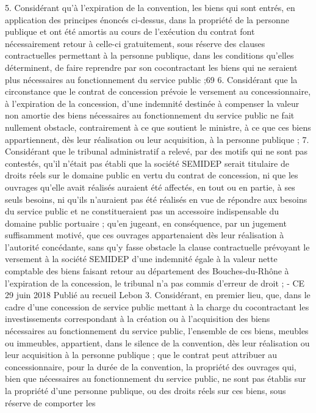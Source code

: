 \documentclass[11pt,a4paper]{report}
\begin{document}
5. Considérant qu'à l'expiration de la convention, les biens qui sont entrés, en application des principes
énoncés ci-dessus, dans la propriété de la personne publique et ont été amortis au cours de l'exécution
du contrat font nécessairement retour à celle-ci gratuitement, sous réserve des clauses contractuelles
permettant à la personne publique, dans les conditions qu'elles déterminent, de faire reprendre par son
cocontractant les biens qui ne seraient plus nécessaires au fonctionnement du service public ;69
6. Considérant que la circonstance que le contrat de concession prévoie le versement au
concessionnaire, à l'expiration de la concession, d'une indemnité destinée à compenser la valeur non
amortie des biens nécessaires au fonctionnement du service public ne fait nullement obstacle,
contrairement à ce que soutient le ministre, à ce que ces biens appartiennent, dès leur réalisation ou
leur acquisition, à la personne publique ;
7. Considérant que le tribunal administratif a relevé, par des motifs qui ne sont pas contestés, qu'il
n'était pas établi que la société SEMIDEP serait titulaire de droits réels sur le domaine public en vertu
du contrat de concession, ni que les ouvrages qu'elle avait réalisés auraient été affectés, en tout ou en
partie, à ses seuls besoins, ni qu'ils n'auraient pas été réalisés en vue de répondre aux besoins du
service public et ne constitueraient pas un accessoire indispensable du domaine public portuaire ; qu'en
jugeant, en conséquence, par un jugement suffisamment motivé, que ces ouvrages appartenaient dès
leur réalisation à l'autorité concédante, sans qu'y fasse obstacle la clause contractuelle prévoyant le
versement à la société SEMIDEP d'une indemnité égale à la valeur nette comptable des biens faisant
retour au département des Bouches-du-Rhône à l'expiration de la concession, le tribunal n'a pas
commis d'erreur de droit ;
- CE 29 juin 2018  Publié au recueil Lebon 3. Considérant, en premier lieu, que,
dans le cadre d'une concession de service public mettant à la charge du cocontractant les
investissements correspondant à la création ou à l'acquisition des biens nécessaires au
fonctionnement du service public, l'ensemble de ces biens, meubles ou immeubles, appartient, dans
le silence de la convention, dès leur réalisation ou leur acquisition à la personne publique ; que le
contrat peut attribuer au concessionnaire, pour la durée de la convention, la propriété des
ouvrages qui, bien que nécessaires au fonctionnement du service public, ne sont pas établis sur la
propriété d'une personne publique, ou des droits réels sur ces biens, sous réserve de comporter les
\end{document}
